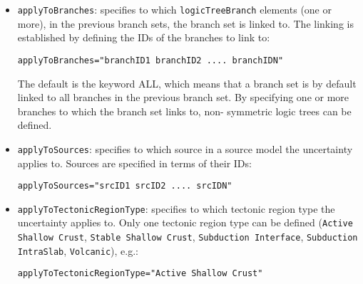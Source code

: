 \begin{itemize}

    \item \Verb+applyToBranches+: specifies to which \Verb+logicTreeBranch+
	elements (one or more), in the previous branch sets, the branch set
	is linked to. The linking is established by defining the IDs of the
	branches to link to:

	\begin{Verbatim}[commandchars=\\\{\}, samepage=true]
	applyToBranches="branchID1 branchID2 .... branchIDN"
	\end{Verbatim}

    The default is the keyword ALL, which means that a branch set is by
    default linked to all branches in the previous branch set. By
    specifying one or  more branches to which the branch set links to, non-
    symmetric logic trees can be defined.

    \item \Verb+applyToSources+: specifies to which source in a source model
	the uncertainty applies to. Sources are specified in terms of their IDs:

	\begin{Verbatim}[commandchars=\\\{\}, samepage=true]
	applyToSources="srcID1 srcID2 .... srcIDN"
	\end{Verbatim}

    \item \Verb+applyToTectonicRegionType+: specifies to which tectonic
	region type the uncertainty applies to. Only one tectonic region type can
	be defined (\texttt{Active Shallow Crust}, \texttt{Stable
	Shallow Crust}, \texttt{Subduction Interface}, \texttt{Subduction}
	\texttt{IntraSlab}, \texttt{Volcanic}), e.g.:

	\begin{Verbatim}[commandchars=\\\{\}]
	applyToTectonicRegionType="Active Shallow Crust"
	\end{Verbatim}

\end{itemize}
